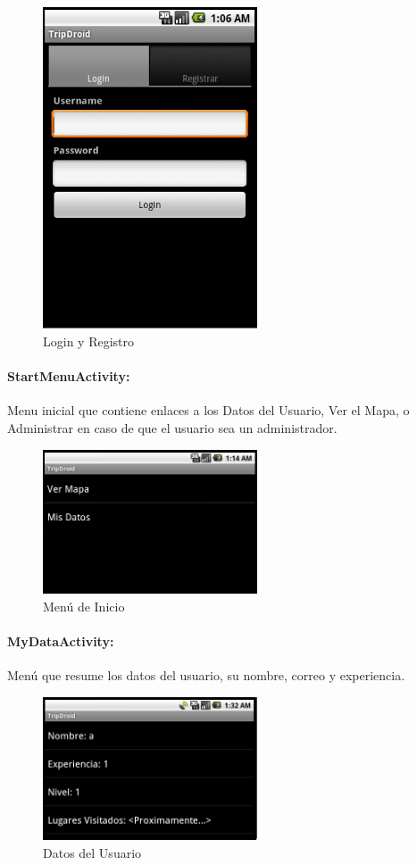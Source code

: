 \documentclass[10pt,letterpaper]{article}
\begin{document}
\begin{figure}[h]
\hspace{3cm}
\includegraphics[width=180pt]{./imgs/TripdroidLogin.png}
\caption{Login y Registro}
\end{figure}

\newpage
\paragraph{StartMenuActivity:} Menu inicial que contiene enlaces a los Datos del Usuario, Ver el Mapa, o Administrar en caso de que el usuario sea un administrador.

\begin{figure}[h]
\hspace{3cm}
\includegraphics[width=180pt]{./imgs/TripdroidStartMenu.png}
\caption{Menú de Inicio}
\end{figure}

\paragraph{MyDataActivity:} Menú que resume los datos del usuario, su nombre, correo y experiencia.

\begin{figure}[h]
\hspace{3cm}
\includegraphics[width=180pt]{./imgs/TripdroidDatos.png}
\caption{Datos del Usuario}
\end{figure}
\end{document}
